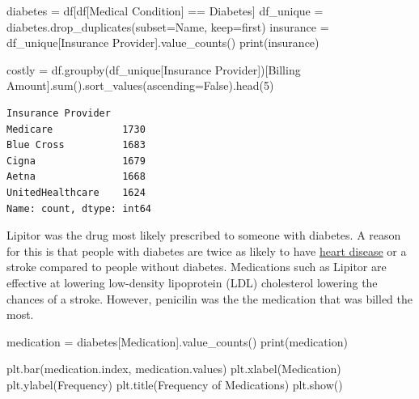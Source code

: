 \documentclass[
  letterpaper,
  DIV=11,
  numbers=noendperiod]{scrartcl}
\newenvironment{Shaded}{\begin{snugshade}}{\end{snugshade}}
\newcommand{\BuiltInTok}[1]{\textcolor[rgb]{0.00,0.23,0.31}{#1}}
\newcommand{\DecValTok}[1]{\textcolor[rgb]{0.68,0.00,0.00}{#1}}
\newcommand{\NormalTok}[1]{\textcolor[rgb]{0.00,0.23,0.31}{#1}}
\newcommand{\OperatorTok}[1]{\textcolor[rgb]{0.37,0.37,0.37}{#1}}
\newcommand{\StringTok}[1]{\textcolor[rgb]{0.13,0.47,0.30}{#1}}
\newcommand{\VariableTok}[1]{\textcolor[rgb]{0.07,0.07,0.07}{#1}}
\begin{document}
\begin{Shaded}
\begin{Highlighting}[]
\NormalTok{diabetes }\OperatorTok{=}\NormalTok{ df[df[}\StringTok{\textquotesingle{}Medical Condition\textquotesingle{}}\NormalTok{] }\OperatorTok{==} \StringTok{\textquotesingle{}Diabetes\textquotesingle{}}\NormalTok{]}
\NormalTok{df\_unique }\OperatorTok{=}\NormalTok{ diabetes.drop\_duplicates(subset}\OperatorTok{=}\StringTok{\textquotesingle{}Name\textquotesingle{}}\NormalTok{, keep}\OperatorTok{=}\StringTok{\textquotesingle{}first\textquotesingle{}}\NormalTok{)}
\NormalTok{insurance }\OperatorTok{=}\NormalTok{ df\_unique[}\StringTok{\textquotesingle{}Insurance Provider\textquotesingle{}}\NormalTok{].value\_counts()}
\BuiltInTok{print}\NormalTok{(insurance)}

\NormalTok{costly }\OperatorTok{=}\NormalTok{ df.groupby(df\_unique[}\StringTok{\textquotesingle{}Insurance Provider\textquotesingle{}}\NormalTok{])[}\StringTok{\textquotesingle{}Billing Amount\textquotesingle{}}\NormalTok{].}\BuiltInTok{sum}\NormalTok{().sort\_values(ascending}\OperatorTok{=}\VariableTok{False}\NormalTok{).head(}\DecValTok{5}\NormalTok{)}
\end{Highlighting}
\end{Shaded}

\begin{verbatim}
Insurance Provider
Medicare            1730
Blue Cross          1683
Cigna               1679
Aetna               1668
UnitedHealthcare    1624
Name: count, dtype: int64
\end{verbatim}

Lipitor was the drug most likely prescribed to someone with diabetes. A
reason for this is that people with diabetes are twice as likely to have
\href{https://www.cdc.gov/diabetes/diabetes-complications/diabetes-and-your-heart.html}{heart
disease} or a stroke compared to people without diabetes. Medications
such as Lipitor are effective at lowering low-density lipoprotein (LDL)
cholesterol lowering the chances of a stroke. However, penicilin was the
the medication that was billed the most.

\begin{Shaded}
\begin{Highlighting}[]
\NormalTok{medication }\OperatorTok{=}\NormalTok{ diabetes[}\StringTok{\textquotesingle{}Medication\textquotesingle{}}\NormalTok{].value\_counts()}
\BuiltInTok{print}\NormalTok{(medication)}

\NormalTok{plt.bar(medication.index, medication.values)}
\NormalTok{plt.xlabel(}\StringTok{\textquotesingle{}Medication\textquotesingle{}}\NormalTok{)}
\NormalTok{plt.ylabel(}\StringTok{\textquotesingle{}Frequency\textquotesingle{}}\NormalTok{)}
\NormalTok{plt.title(}\StringTok{\textquotesingle{}Frequency of Medications\textquotesingle{}}\NormalTok{)}
\NormalTok{plt.show()}
\end{Highlighting}
\end{Shaded}
\end{document}
